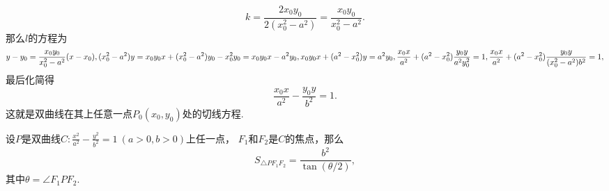 \begin{example}
\begin{solution}
\begin{equation*}
	k = \frac{2 x_0 y_0}{2 (x_0^2 - a^2)}
	= \frac{x_0 y_0}{x_0^2 - a^2}.
\end{equation*}
那么\(l\)的方程为\begin{equation*}
	y - y_0 = \frac{x_0 y_0}{x_0^2 - a^2} (x - x_0), \\
	(x_0^2 - a^2) y = x_0 y_0 x + (x_0^2 - a^2) y_0 - x_0^2 y_0
	= x_0 y_0 x - a^2 y_0, \\
	x_0 y_0 x + (a^2 - x_0^2) y = a^2 y_0, \\
	\frac{x_0 x}{a^2} + (a^2 - x_0^2) \frac{y_0 y}{a^2 y_0^2} = 1, \\
	\frac{x_0 x}{a^2} + (a^2 - x_0^2) \frac{y_0 y}{(x_0^2 - a^2) b^2} = 1,
\end{equation*}
最后化简得\begin{equation}\label{equation:平面解析几何.双曲线的切线}
	\frac{x_0 x}{a^2} - \frac{y_0 y}{b^2} = 1.
\end{equation}
这就是双曲线在其上任意一点\(P_0(x_0,y_0)\)处的切线方程.
\end{solution}
\end{example}

\begin{theorem}[双曲线的焦点三角形]
设\(P\)是双曲线\(C: \frac{x^2}{a^2} - \frac{y^2}{b^2} = 1\ (a>0,b>0)\)上任一点，
\(F_1\)和\(F_2\)是\(C\)的焦点，那么\begin{equation*}
	S_{\triangle P F_1 F_2} = \frac{b^2}{\tan(\theta/2)},
\end{equation*}
其中\(\theta=\angle{F_1 P F_2}\).
\end{theorem}
